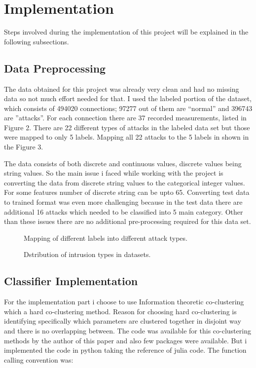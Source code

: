 \documentclass{acm_proc_article-sp}
\begin{document}
\section{Implementation}
Steps involved during the implementation of this project will be explained in the following subsections.

\subsection{Data Preprocessing}

The data obtained for this project was already very clean and had no missing data so not much effort needed for that. I used the labeled portion of the dataset, which consists of 494020 connections; 97277 out of them are ``normal'' and 396743 are ''attacks''. For each connection there are 37 recorded measurements, listed in Figure 2. There are 22 different types of attacks in the labeled data set but those were mapped to only 5 labels. Mapping all 22 attacks to the 5 labels in shown in the Figure 3.

The data consists of both discrete and continuous values, discrete values being string values. So the main issue i faced while working with the project is converting the data from discrete string values to the categorical integer values. For some features number of discrete string can be upto 65. Converting test data to trained format was even more challenging because in the test data there are additional 16 attacks which needed to be classified into 5 main category. Other than these issues there are no additional pre-processing required for this data set.

\begin{figure}
\centering
{}
\caption{Mapping of different labels into different attack types.}
\end{figure}

\begin{figure}
	\centering
	\caption{Dstribution of intrusion types in datasets.}
\end{figure}
\subsection{Classifier Implementation}
For the implementation part i choose to use Information theoretic co-clustering \cite{itcc} which a hard co-clustering method. Reason for choosing hard co-clustering is identifying specifically which parameters are clustered together in disjoint way and there is no overlapping between. The code was available for this co-clustering methods by the author of this paper and also few packages were available. But i implemented the code in python taking the reference of julia code. The  function calling convention was:
\end{document}
